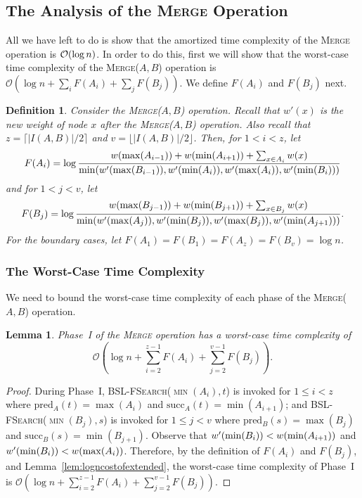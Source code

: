 \documentclass[11pt]{article}
\newcommand{\kwUnion}{Merge}
\newcommand{\Union}{\mbox{\textsc{\kwUnion{}}}}
\newcommand{\Unionx}[2]{\mbox{\textsc{\kwUnion(\ensuremath{#1,#2})}}}
\newcommand{\Bslfsrcx}[2]{\mbox{\textsc{BSL-FSearch(\ensuremath{#1,#2})}}}
\newcommand{\lasta}{z}
\newcommand{\lastb}{v}
\newcommand{\intmax}[1]{\ensuremath{\max(\intl #1)}}
\newcommand{\intmin}[1]{\ensuremath{\min(\intl #1)}}
\newcommand{\intnum}[2]{\ensuremath{|I(\set{#1},\set{#2})|}}
\newcommand{\intl}[1]{\ensuremath{#1}}
\newcommand{\nodeweight}[1]{{\ensuremath{w(\node #1)}}}
\newcommand{\nodenewweight}[1]{{\ensuremath{w'(\node #1)}}}
\newcommand{\node}[1]{\ensuremath{#1}}
\newcommand{\set}[1]{\ensuremath{#1}}
\newcommand{\intfun}[1]{\ensuremath{F(\intl #1)}}
\newcommand{\pre}[2]{\text{pred}\ensuremath{_{#1}(#2)}}
\newcommand{\suc}[2]{\text{succ}\ensuremath{_{#1}(#2)}}
\newcounter{count}
\newtheorem{lemma}[count]{Lemma}
\newtheorem{defn}[count]{Definition}
\begin{document}
\subsection{The Analysis of the \Union{} Operation} 
\label{subsec:AnalysisUnion} 
All we have left to do is show that the amortized time complexity of the \Union{} operation is ${\cal O}(\log n)$.  In order to do this, first we will show that the worst-case time complexity of the \Unionx{A}{B} operation is $\mathcal O\left(\log n + \sum_i \intfun{A_i}+\sum_j \intfun{B_j}\right)$. We define \intfun{A_i} and \intfun{B_j} next. 

\begin{defn} 
Consider the \Unionx{A}{B} operation. 
Recall that \nodenewweight{x} is the new weight of node \node x after the \Unionx{A}{B} operation. Also recall that $\lasta = \lceil\intnum{A}{B}/2\rceil$ and $\lastb = \lfloor\intnum{A}{B}/2\rfloor$. 
Then, for $1< i < \lasta$, let 
\[ 
\intfun{A_i} = \log\frac{\nodeweight{\intmax{A_{i-1}}}+\nodeweight{\intmin{A_{i+1}}} + \sum_{\node x\in \intl A_i}{\nodeweight x}}{\min(\nodenewweight{\intmax{{B_{i-1}}}}, \nodenewweight{\intmin{{A_i}}}, \nodenewweight{\intmax{{A_i}}}, \nodenewweight{\intmin{{B_{i}}}})} 
\] 
and for $1< j < \lastb$, let 
\[ 
\intfun{B_j} = \log\frac{\nodeweight{\intmax{B_{j-1}}}+\nodeweight{\intmin{B_{j+1}}} + \sum_{\node x\in \intl B_j}{\nodeweight x}}{\min(\nodenewweight{\intmax{{A_{j}}}}, \nodenewweight{\intmin{{B_j}}}, \nodenewweight{\intmax{{B_j}}}, \nodenewweight{\intmin{{A_{j+1}}}})}. 
\] 
For the boundary cases, let $\intfun{A_1} = \intfun{B_1} = \intfun{A_{\lasta}} = \intfun{B_{\lastb}} = \log n$. 
\end{defn} 


\subsubsection{The Worst-Case Time Complexity} 
\label{subsubsec:AnalysisUnionWorst} 


We need to bound the worst-case time complexity of each phase of the \Unionx{A}{B} operation. 


\begin{lemma} 
\label{lem:phaseone} 
Phase~I of the \Union{} operation has a worst-case time complexity of \[\mathcal O\left(\log n+ \sum_{i=2}^{\lasta-1} \intfun{A_i} +\sum_{j=2}^{\lastb-1} \intfun{B_j}\right).\] 
\end{lemma} 

\begin{proof} 
During Phase~I, \Bslfsrcx{\intmin{A_i}}{t} is invoked for $1\leq i < \lasta$ where $\pre{A}{t} = \intmax{A_i}$ and $\suc{A}{t} = \intmin{A_{i+1}}$;  and \Bslfsrcx{\intmin{B_j}}{s} is invoked for $1\leq j < \lastb$ where $\pre{B}{s} = \intmax{B_j}$ and $\suc{B}{s} = \intmin{B_{j+1}}$. Observe that $\nodenewweight{\intmin{{B_i}}}<\nodeweight{\intmin{A_{i+1}}}$ and $\nodenewweight{\intmin{{B_i}}}<\nodeweight{\intmax{A_{i}}}$. Therefore, by the definition of \intfun{A_i} and \intfun{B_j}, and Lemma~\ref{lem:logncostofextended}, the worst-case time complexity of Phase~I is $\mathcal O\left(\log n+ \sum_{i=2}^{\lasta-1} \intfun{A_i} +\sum_{j=2}^{\lastb-1} \intfun{B_j}\right)$. 
\end{proof} 
\end{document}
